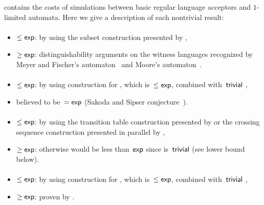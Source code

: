  contains the costs of simulations between basic regular language acceptors and $1$-limited automata.
Here we give a description of each nontrivial result:
\paragraph{\ONFA{}\tto\ODFA}\label{cost:1NFAto1DFA}
\begin{itemize}
	\item $\le\mathsf{exp}$: by using the subset construction presented by ,
	\item $\ge\mathsf{exp}$: distinguishability arguments on the witness languages recognized by Meyer and Fischer's automaton~\cite{MeyFis71} and Moore's automaton~\cite{Moo71}.
\end{itemize}
\paragraph{\ONFA{}\tto\TDFA}
\begin{itemize}
	\item $\le\mathsf{exp}$: by using construction for \hyperref[cost:1NFAto1DFA]{\ONFA{}\tto\ODFA}, which is~$\le\mathsf{exp}$, combined with~$\mathsf{trivial}$ \ODFA{}\tto\TDFA,
	\item believed to be~$=\mathsf{exp}$ (Sakoda and Sipser conjecture~\cite{SakSip78}).
\end{itemize}
\paragraph{\TDFA{}\tto\ODFA}\label{cost:2DFAto1DFA}
\begin{itemize}
	\item $\le\mathsf{exp}$: by using the transition table construction presented by  or the crossing sequence construction presented in parallel by ,
	\item $\ge\mathsf{exp}$: otherwise \hyperref[cost:2DFAto1NFA]{\TDFA{}\tto\ONFA} would be less than~$\mathsf{exp}$ since \ODFA{}\tto\ONFA is~$\mathsf{trivial}$ (see lower bound below).
\end{itemize}
\paragraph{\TDFA{}\tto\ONFA}\label{cost:2DFAto1NFA}
\begin{itemize}
	\item $\le\mathsf{exp}$: by using construction for \hyperref[cost:2DFAto1DFA]{\TDFA{}\tto\ODFA}, which is~$\le\mathsf{exp}$, combined with~$\mathsf{trivial}$ \ODFA{}\tto\ONFA,
	\item $\ge\mathsf{exp}$: proven by .
\end{itemize}
